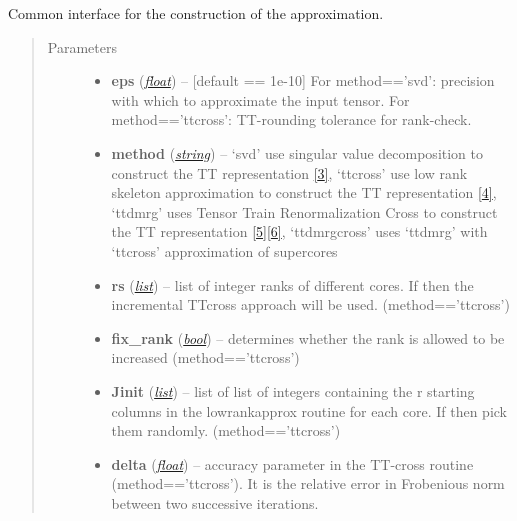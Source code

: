 \documentclass[a4paper,10pt,english]{sphinxmanual}
\begin{document}
\begin{fulllineitems}
\begin{fulllineitems}
\label{api-ttmat:TensorToolbox.core.TTmat.build}
Common interface for the construction of the approximation.
\begin{quote}\begin{description}
\item[{Parameters}] \leavevmode\begin{itemize}
\item {} 
\textbf{eps} (\href{http://docs.python.org/library/functions.html\#float}{\emph{float}}) -- {[}default == 1e-10{]} For method=='svd': precision with which to approximate the input tensor. For method=='ttcross': TT-rounding tolerance for rank-check.

\item {} 
\textbf{method} (\href{http://docs.python.org/library/string.html\#module-string}{\emph{string}}) -- `svd' use singular value decomposition to construct the TT representation {\hyperref[zrefs:oseledets2011]{{[}3{]}}}, `ttcross' use low rank skeleton approximation to construct the TT representation {\hyperref[zrefs:oseledets2010]{{[}4{]}}}, `ttdmrg' uses Tensor Train Renormalization Cross to construct the TT representation {\hyperref[zrefs:savostyanov2011]{{[}5{]}}}{\hyperref[zrefs:savostyanov2013]{{[}6{]}}}, `ttdmrgcross' uses `ttdmrg' with `ttcross' approximation of supercores

\item {} 
\textbf{rs} (\href{http://docs.python.org/library/functions.html\#list}{\emph{list}}) -- list of integer ranks of different cores. If  then the incremental TTcross approach will be used. (method=='ttcross')

\item {} 
\textbf{fix\_rank} (\href{http://docs.python.org/library/functions.html\#bool}{\emph{bool}}) -- determines whether the rank is allowed to be increased (method=='ttcross')

\item {} 
\textbf{Jinit} (\href{http://docs.python.org/library/functions.html\#list}{\emph{list}}) -- list of list of integers containing the r starting columns in the lowrankapprox routine for each core. If  then pick them randomly. (method=='ttcross')

\item {} 
\textbf{delta} (\href{http://docs.python.org/library/functions.html\#float}{\emph{float}}) -- accuracy parameter in the TT-cross routine (method=='ttcross'). It is the relative error in Frobenious norm between two successive iterations.


\end{itemize}
\end{description}
\end{quote}
\end{fulllineitems}
\end{fulllineitems}
\end{document}

